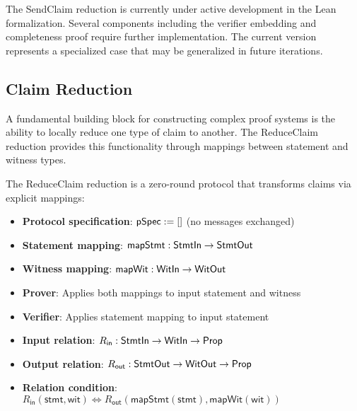 \begin{remark}
    The SendClaim reduction is currently under active development in the Lean formalization. Several components including the verifier embedding and completeness proof require further implementation. The current version represents a specialized case that may be generalized in future iterations.
\end{remark}

\subsection{Claim Reduction}

A fundamental building block for constructing complex proof systems is the ability to locally reduce one type of claim to another. The ReduceClaim reduction provides this functionality through mappings between statement and witness types.

\begin{definition}
    \label{def:reduceclaim_reduction}
    The ReduceClaim reduction is a zero-round protocol that transforms claims via explicit mappings:
    \begin{itemize}
        \item \textbf{Protocol specification}: $\mathsf{pSpec} := []$ (no messages exchanged)
        \item \textbf{Statement mapping}: $\mathsf{mapStmt} : \mathsf{StmtIn} \to \mathsf{StmtOut}$
        \item \textbf{Witness mapping}: $\mathsf{mapWit} : \mathsf{WitIn} \to \mathsf{WitOut}$
        \item \textbf{Prover}: Applies both mappings to input statement and witness
        \item \textbf{Verifier}: Applies statement mapping to input statement
        \item \textbf{Input relation}: $R_{\mathsf{in}} : \mathsf{StmtIn} \to \mathsf{WitIn} \to \mathsf{Prop}$
        \item \textbf{Output relation}: $R_{\mathsf{out}} : \mathsf{StmtOut} \to \mathsf{WitOut} \to \mathsf{Prop}$
        \item \textbf{Relation condition}: $R_{\mathsf{in}}(\mathsf{stmt}, \mathsf{wit}) \iff R_{\mathsf{out}}(\mathsf{mapStmt}(\mathsf{stmt}), \mathsf{mapWit}(\mathsf{wit}))$
    \end{itemize}
\end{definition}

